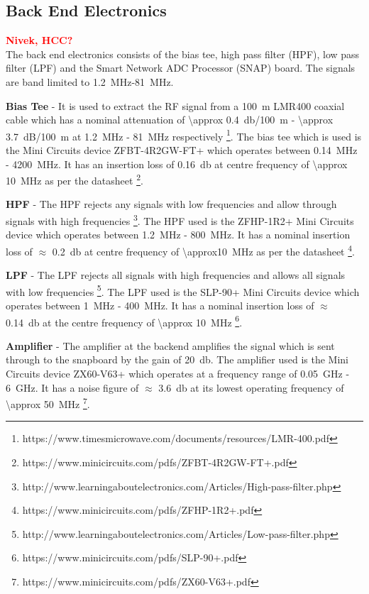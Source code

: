 \documentclass{ws-jai}
\begin{document}
\subsection{Back End Electronics}
\textcolor{red}{\bf Nivek, HCC?} \\
The back end electronics consists of the bias tee, high pass filter
(HPF), low pass filter (LPF) and the Smart Network ADC Processor
(SNAP) board.  The signals are band limited to \SI{1.2}{MHz}-\SI{81}{MHz}.

\textbf{Bias Tee} - It is used to extract the RF signal from a
\SI{100}{\metre} LMR400 coaxial cable which has a nominal attenuation
of \SI{\approx 0.4}{\decibel/\SI{100}{m}} - \SI{\approx
  3.7}{dB/\SI{100}{\metre}} at \SI{1.2}{MHz} - \SI{81}{MHz}
respectively \footnote{https://www.timesmicrowave.com/documents/resources/LMR-400.pdf}. The
bias tee which is used is the Mini Circuits device ZFBT-4R2GW-FT+
which operates between \SI{0.14}{MHz} - \SI{4200}{MHz}. It has an
insertion loss of \SI{0.16}{\decibel} at centre frequency of
\SI{\approx 10}{MHz} as per the
datasheet \footnote{https://www.minicircuits.com/pdfs/ZFBT-4R2GW-FT+.pdf}.

\textbf{HPF} - The HPF rejects any signals with low frequencies and
allow through signals with high
frequencies \footnote{http://www.learningaboutelectronics.com/Articles/High-pass-filter.php}. The
HPF used is the ZFHP-1R2+ Mini Circuits device which operates between
\SI{1.2}{MHz} - \SI{800}{MHz}. It has a nominal insertion loss of
$\approx$ \SI{0.2}{\decibel} at centre frequency of
\SI{\approx10}{MHz} as per the
datasheet \footnote{https://www.minicircuits.com/pdfs/ZFHP-1R2+.pdf}.

\textbf{LPF} - The LPF rejects all signals with high frequencies and
allows all signals with low
frequencies \footnote{http://www.learningaboutelectronics.com/Articles/Low-pass-filter.php}. The
LPF used is the SLP-90+ Mini Circuits device which operates between
\SI{1}{MHz} - \SI{400}{MHz}. It has a nominal insertion loss of
$\approx$ \SI{0.14}{\decibel} at the centre frequency of \SI{\approx
  10}{MHz} \footnote{https://www.minicircuits.com/pdfs/SLP-90+.pdf}.

\textbf{Amplifier} - The amplifier at the backend amplifies the signal
which is sent through to the snapboard by the gain of
\SI{+20}{\decibel}. The amplifier used is the Mini Circuits device
ZX60-V63+ which operates at a frequency range of \SI{0.05}{GHz} -
\SI{6}{GHz}. It has a noise figure of $\approx$ \SI{3.6}{\decibel} at
its lowest operating frequency of \SI{\approx
  50}{MHz} \footnote{https://www.minicircuits.com/pdfs/ZX60-V63+.pdf}.
\end{document}
